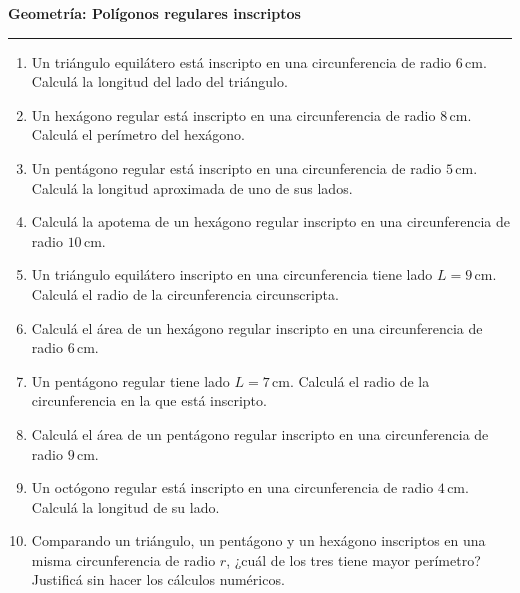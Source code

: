 \documentclass[11pt]{article}
\begin{document}
\begin{minipage}[t][\textheight]{\linewidth}
\begin{center}
{\Large \textbf{Geometría: Polígonos regulares inscriptos}}\\[2pt]
\rule{7cm}{0.5pt}
\end{center}

\vspace{0.5cm}

\begin{enumerate}[leftmargin=1.2cm, itemsep=0.5cm plus 1fill]

\item Un triángulo equilátero está inscripto en una circunferencia de radio $6\,\text{cm}$. Calculá la longitud del lado del triángulo.

\item Un hexágono regular está inscripto en una circunferencia de radio $8\,\text{cm}$. Calculá el perímetro del hexágono.

\item Un pentágono regular está inscripto en una circunferencia de radio $5\,\text{cm}$. Calculá la longitud aproximada de uno de sus lados.

\item Calculá la apotema de un hexágono regular inscripto en una circunferencia de radio $10\,\text{cm}$.

\item Un triángulo equilátero inscripto en una circunferencia tiene lado $L = 9\,\text{cm}$. Calculá el radio de la circunferencia circunscripta.

\item Calculá el área de un hexágono regular inscripto en una circunferencia de radio $6\,\text{cm}$.

\item Un pentágono regular tiene lado $L = 7\,\text{cm}$. Calculá el radio de la circunferencia en la que está inscripto.

\item Calculá el área de un pentágono regular inscripto en una circunferencia de radio $9\,\text{cm}$.

\item Un octógono regular está inscripto en una circunferencia de radio $4\,\text{cm}$. Calculá la longitud de su lado.

\item Comparando un triángulo, un pentágono y un hexágono inscriptos en una misma circunferencia de radio $r$, ¿cuál de los tres tiene mayor perímetro? Justificá sin hacer los cálculos numéricos.


\end{enumerate}
\end{minipage}
\end{document}

